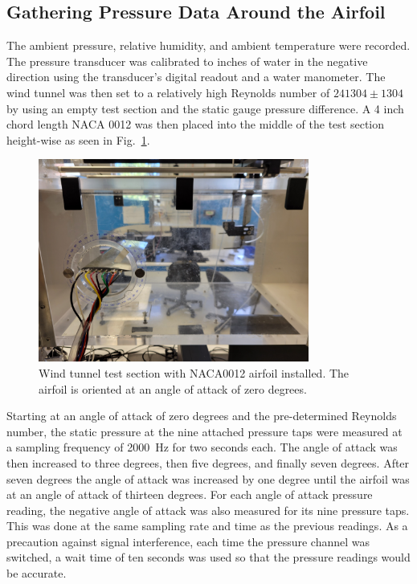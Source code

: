 \documentclass[journal,letterpaper]{IEEEtran}
\begin{document}
\subsection{Gathering Pressure Data Around the Airfoil}

The ambient pressure, relative humidity, and ambient temperature were recorded.
The pressure transducer was calibrated to inches of water in the negative direction using the transducer's digital readout and a water manometer.
The wind tunnel was then set to a relatively high Reynolds number of $241304 \pm 1304$ by using an empty test section and the static gauge pressure difference.
A 4 inch chord length NACA 0012 was then placed into the middle of the test section height-wise as seen in Fig.~\ref{fig:section}.

\begin{figure}[H]
    \centering
    \includegraphics[width=3.5in]{testSection}
    \caption{Wind tunnel test section with NACA0012 airfoil installed. The airfoil is oriented at an angle of attack of zero degrees.}
    \label{fig:section}
\end{figure}

Starting at an angle of attack of zero degrees and the pre-determined Reynolds number, the static pressure at the nine attached pressure taps were measured at a sampling frequency of \qty{2000}{\Hz} for two seconds each.
The angle of attack was then increased to three degrees, then five degrees, and finally seven degrees.
After seven degrees the angle of attack was increased by one degree until the airfoil was at an angle of attack of thirteen degrees.
For each angle of attack pressure reading, the negative angle of attack was also measured for its nine pressure taps.
This was done at the same sampling rate and time as the previous readings.
As a precaution against signal interference, each time the pressure channel was switched, a wait time of ten seconds was used so that the pressure readings would be accurate.
\end{document}
